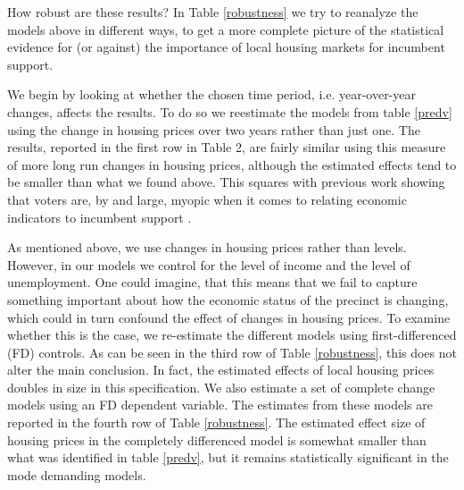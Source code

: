 \documentclass[12pt,a4paper]{article}
\begin{document}
	How robust are these results? In Table \ref{robustness} we try to reanalyze the models above in different ways, to get a more complete picture of the statistical evidence for (or against) the importance of local housing markets for incumbent support.
	
	
	
	
	We begin by looking at whether the chosen time period, i.e. year-over-year changes, affects the results. To do so we reestimate the models from table \ref{predv} using the change in housing prices over two years rather than just one. The results, reported in the first row in Table 2, are fairly similar using this measure of more long run changes in housing prices, although the estimated effects tend to be smaller than what we found above. This squares with previous work showing that voters are, by and large, myopic when it comes to relating economic indicators to incumbent support \citep{healy2009myopic,healy2014substituting}.
	
	As mentioned above, we use changes in housing prices rather than levels. However, in our models we control for the level of income and the level of unemployment. One could imagine, that this means that we fail to capture something important about how the economic status of the precinct is changing, which could in turn confound the effect of changes in housing prices. To examine whether this is the case, we re-estimate the different models using first-differenced (FD) controls. As can be seen in the third row of Table \ref{robustness}, this does not alter the main conclusion. In fact, the estimated effects of local housing prices doubles in size in this specification. We also estimate a set of complete change models using an FD dependent variable. The estimates from these models are reported in the fourth row of Table \ref{robustness}. The estimated effect size of housing prices in the completely differenced model is somewhat smaller than what was identified in table \ref{predv}, but it remains statistically significant in the mode demanding models.
	
\end{document}
